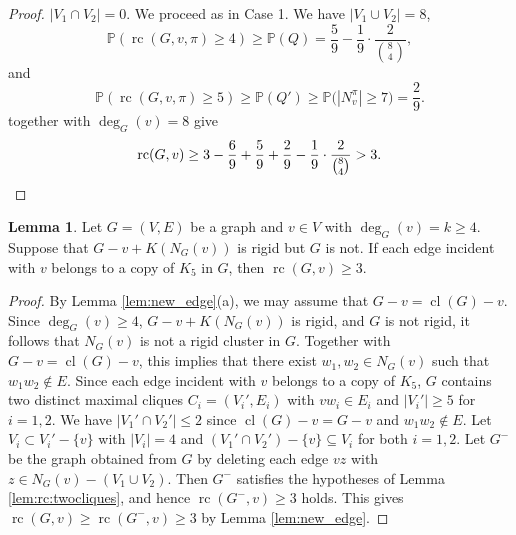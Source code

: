 \documentclass[11pt,a4paper]{article}
\theoremstyle{definition}
\newtheorem{lemma}[theorem]{Lemma}
\DeclareMathOperator{\rc}{rc}
\DeclareMathOperator{\cl}{cl}
\newcommand{\Prob}{\mathbb{P}}
\begin{document}
\begin{proof}
\medskip
{} $|V_1\cap V_2|=0$.
\medskip
We proceed as in Case 1.
    We have $|V_1\cup V_2|=8$, 
    \begin{equation}\label{fq5}
        \Prob(\rc(G, v, \pi)\geq 4) \geq\Prob(Q)= \frac{5}{9}-\frac{1}{9}\cdot \frac{2}{\binom{8}{4}},
    \end{equation}
    and
    \begin{equation}\label{fq6}
        \Prob(\rc(G, v, \pi)\geq 5) \geq \Prob(Q')\geq \Prob\big(|N_v^\pi|\geq 7)=\frac{2}{9}.
    \end{equation}
     together with 
    $\deg_G(v)= 8$
    give
    \begin{equation*}
        \rc(G,v)\geq 3 -\frac{6}{9}+\frac{5}{9} +\frac{2}{9}-\frac{1}{9}\cdot \frac{2}{\binom{8}{4}}> 3. \qedhere
    \end{equation*}
\end{proof}



\begin{lemma}\label{lem:mainC5lemma}
    Let $G=(V,E)$ be a graph and $v\in V$ with $\deg_G(v)=k\geq 4$.
    Suppose that  $G-v+K(N_G(v))$ is rigid but $G$ is not. If each edge incident with $v$ belongs to a copy of $K_5$ in $G$, then
    $\rc(G,v)\geq 3$.
\end{lemma}
\begin{proof}

    By 
    Lemma \ref{lem:new_edge}(a), we may assume that 
    $G-v=\cl(G)-v$.
    Since  $\deg_G(v)\geq 4$,
    $G-v+K(N_G(v))$ is rigid, and $G$ is not rigid, it follows that $N_G(v)$ is not a rigid cluster in $G$. 
    Together with $G-v=\cl(G)-v$, this implies that
    there exist $w_1,w_2\in N_G(v)$ such that $w_1w_2\notin E$.  
    Since each edge incident with $v$ belongs to a copy of $K_5$,
    $G$ contains two distinct maximal cliques $C_i=(V_i',E_i)$ with $vw_i\in E_i$
    and $|V_i'|\geq 5$ for $i=1,2$.
    We have $|V_1'\cap V_2'|\leq 2$ since $\cl(G)-v=G-v$ and $w_1w_2\not\in E$.
    Let $V_i\subset V_i'-\{v\}$ with $|V_i|=4$ and $(V_1'\cap V_2')-\{v\}\subseteq V_i$ for both  $i=1,2$. Let $G^-$ be the graph obtained from $G$ by deleting each edge $vz$ with $z\in N_G(v)-(V_1\cup V_2)$. Then $G^-$ satisfies the hypotheses of Lemma \ref{lem:rc:twocliques}, and hence $\rc(G^-,v)\geq 3$ holds. 
     This gives $\rc(G,v)\geq \rc(G^-,v)\geq 3$ by Lemma \ref{lem:new_edge}.
\end{proof}
\end{document}
